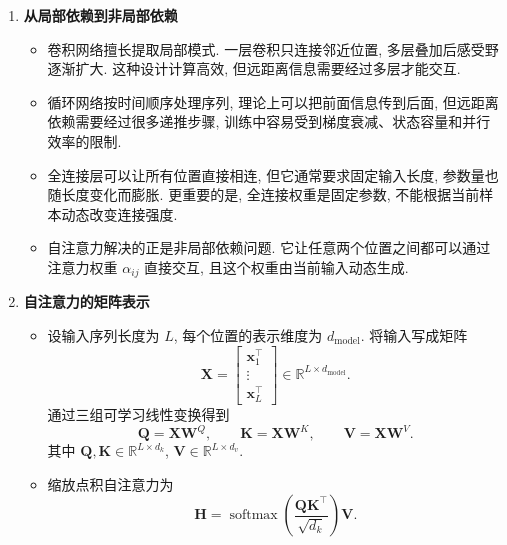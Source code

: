 \documentclass{../nndlcourse}
\begin{document}
\begin{enumerate}
  \item \textbf{从局部依赖到非局部依赖}
    \begin{itemize}
      \item 卷积网络擅长提取局部模式. 一层卷积只连接邻近位置, 多层叠加后感受野逐渐扩大. 这种设计计算高效, 但远距离信息需要经过多层才能交互.
      \item 循环网络按时间顺序处理序列, 理论上可以把前面信息传到后面, 但远距离依赖需要经过很多递推步骤, 训练中容易受到梯度衰减、状态容量和并行效率的限制.
      \item 全连接层可以让所有位置直接相连, 但它通常要求固定输入长度, 参数量也随长度变化而膨胀. 更重要的是, 全连接权重是固定参数, 不能根据当前样本动态改变连接强度.
      \item 自注意力解决的正是非局部依赖问题. 它让任意两个位置之间都可以通过注意力权重 $\alpha_{ij}$ 直接交互, 且这个权重由当前输入动态生成.
    \end{itemize}
  \item \textbf{自注意力的矩阵表示}
    \begin{itemize}
      \item 设输入序列长度为 $L$, 每个位置的表示维度为 $d_{\mathrm{model}}$. 将输入写成矩阵
      \begin{equation*}
        \boldsymbol{X} =
        \begin{bmatrix}
          \boldsymbol{x}_1^{\top}\\
          \vdots\\
          \boldsymbol{x}_L^{\top}
        \end{bmatrix}
        \in \mathbb{R}^{L\times d_{\mathrm{model}}}.
      \end{equation*}
      通过三组可学习线性变换得到
      \begin{equation*}
        \boldsymbol{Q} = \boldsymbol{X}\boldsymbol{W}^Q,\qquad
        \boldsymbol{K} = \boldsymbol{X}\boldsymbol{W}^K,\qquad
        \boldsymbol{V} = \boldsymbol{X}\boldsymbol{W}^V.
      \end{equation*}
      其中 $\boldsymbol{Q},\boldsymbol{K}\in\mathbb{R}^{L\times d_k}$, $\boldsymbol{V}\in\mathbb{R}^{L\times d_v}$.
      \item 缩放点积自注意力为
      \begin{equation*}
        \boldsymbol{H}
        =
        \operatorname{softmax}\left(
          \frac{\boldsymbol{Q}\boldsymbol{K}^{\top}}{\sqrt{d_k}}
        \right)\boldsymbol{V}.
      \end{equation*}

\end{itemize}
\end{enumerate}
\end{document}

